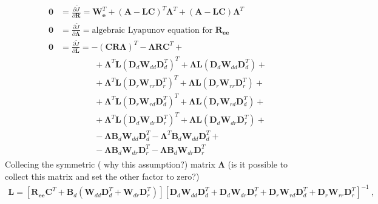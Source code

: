 \documentclass[letterpaper,10pt,english]{jupyterBook}
\begin{document}
\begin{equation*}
\begin{split}\begin{aligned}
 \mathbf{0} & = \frac{\partial \widetilde{J}}{\partial \mathbf{R}} = \mathbf{W}_{\mathbf{e}}^T + (\mathbf{A} - \mathbf{L}\mathbf{C})^T \boldsymbol\Lambda^T + (\mathbf{A}-\mathbf{L}\mathbf{C})\boldsymbol\Lambda^T \\
 \mathbf{0} & = \frac{\partial \widetilde{J}}{\partial \boldsymbol\Lambda} = \text{algebraic Lyapunov equation for $\mathbf{R}_{\mathbf{e}\mathbf{e}}$} \\
 \mathbf{0} & = \frac{\partial \widetilde{J}}{\partial \mathbf{L}} = - ( \mathbf{C} \mathbf{R} \boldsymbol\Lambda )^T - \boldsymbol\Lambda \mathbf{R} \mathbf{C}^T + \\
  & \qquad \qquad + \boldsymbol\Lambda^T \mathbf{L} \left( \mathbf{D}_d \mathbf{W}_{dd} \mathbf{D}^T_d \right)^T + \boldsymbol\Lambda \mathbf{L} \left( \mathbf{D}_d \mathbf{W}_{dd} \mathbf{D}^T_d \right) + \\
  & \qquad \qquad + \boldsymbol\Lambda^T \mathbf{L} \left( \mathbf{D}_r \mathbf{W}_{rr} \mathbf{D}^T_r \right)^T + \boldsymbol\Lambda \mathbf{L} \left( \mathbf{D}_r \mathbf{W}_{rr} \mathbf{D}^T_r \right) + \\
  & \qquad \qquad + \boldsymbol\Lambda^T \mathbf{L} \left( \mathbf{D}_r \mathbf{W}_{rd} \mathbf{D}^T_d \right)^T + \boldsymbol\Lambda \mathbf{L} \left( \mathbf{D}_r \mathbf{W}_{rd} \mathbf{D}^T_d \right) + \\
  & \qquad \qquad + \boldsymbol\Lambda^T \mathbf{L} \left( \mathbf{D}_d \mathbf{W}_{dr} \mathbf{D}^T_r \right)^T + \boldsymbol\Lambda \mathbf{L} \left( \mathbf{D}_d \mathbf{W}_{dr} \mathbf{D}^T_r \right) + \\
  & \qquad \qquad - \boldsymbol\Lambda \mathbf{B}_d \mathbf{W}_{dd} \mathbf{D}_d^T - \boldsymbol\Lambda^T \mathbf{B}_d \mathbf{W}_{dd} \mathbf{D}_d^T + \\
  & \qquad \qquad - \boldsymbol\Lambda \mathbf{B}_d \mathbf{W}_{dr} \mathbf{D}_r^T - \boldsymbol\Lambda \mathbf{B}_d \mathbf{W}_{dr} \mathbf{D}_r^T
\end{aligned}\end{split}
\end{equation*}
\sphinxAtStartPar
Collecing the symmetric ( why this assumption?) matrix \(\boldsymbol\Lambda\) (is it possible to collect this matrix and set the other factor to zero?)
\begin{equation}\label{equation:ch/control/optimal-control-observer-stochastic:eq:observer:gauss:L}
\begin{split}\mathbf{L} = \left[ \mathbf{R}_{\mathbf{e}\mathbf{e}} \mathbf{C}^T + \mathbf{B}_d \left( \mathbf{W}_{dd} \mathbf{D}_d^T + \mathbf{W}_{dr} \mathbf{D}_r^T \right) \right] \left[ 
  \mathbf{D}_d \mathbf{W}_{dd} \mathbf{D}^T_d +
  \mathbf{D}_d \mathbf{W}_{dr} \mathbf{D}^T_r +
  \mathbf{D}_r \mathbf{W}_{rd} \mathbf{D}^T_d +
  \mathbf{D}_r \mathbf{W}_{rr} \mathbf{D}^T_r
\right]^{-1} \ ,\end{split}
\end{equation}
\end{document}
